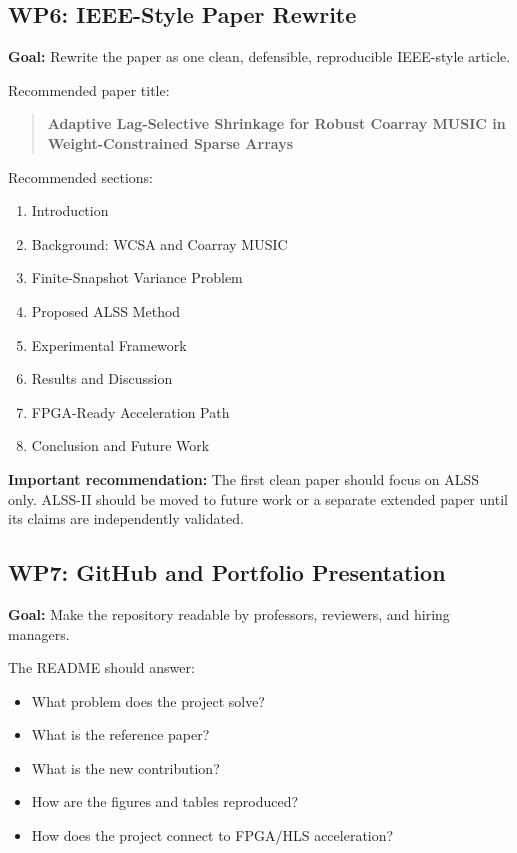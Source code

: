 \documentclass[11pt,letterpaper]{article}
\begin{document}
\subsection{WP6: IEEE-Style Paper Rewrite}

\textbf{Goal:} Rewrite the paper as one clean, defensible, reproducible IEEE-style article.

Recommended paper title:

\begin{quote}
\textbf{Adaptive Lag-Selective Shrinkage for Robust Coarray MUSIC in Weight-Constrained Sparse Arrays}
\end{quote}

Recommended sections:
\begin{enumerate}[leftmargin=*]
    \item Introduction
    \item Background: WCSA and Coarray MUSIC
    \item Finite-Snapshot Variance Problem
    \item Proposed ALSS Method
    \item Experimental Framework
    \item Results and Discussion
    \item FPGA-Ready Acceleration Path
    \item Conclusion and Future Work
\end{enumerate}

\textbf{Important recommendation:} The first clean paper should focus on ALSS only. ALSS-II should be moved to future work or a separate extended paper until its claims are independently validated.

\subsection{WP7: GitHub and Portfolio Presentation}

\textbf{Goal:} Make the repository readable by professors, reviewers, and hiring managers.

The README should answer:
\begin{itemize}[leftmargin=*]
    \item What problem does the project solve?
    \item What is the reference paper?
    \item What is the new contribution?
    \item How are the figures and tables reproduced?
    \item How does the project connect to FPGA/HLS acceleration?
\end{itemize}
\end{document}
